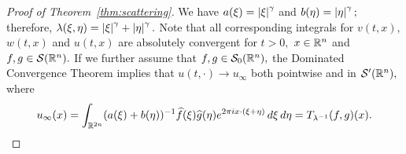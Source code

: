  
 \begin{proof}[Proof of Theorem~\ref{thm:scattering}] We have $a(\xi)=\left\vert \xi \right\vert^\gamma$ and $b(\eta)=\left\vert \eta \right\vert^\gamma;$ therefore, $\lambda(\xi,\eta)=\left\vert \xi \right\vert^\gamma+\left\vert \eta \right\vert^\gamma.$ Note that all corresponding integrals for $v(t,x),$ $w(t,x)$ and $u(t,x)$ are absolutely convergent for $t>0,$ $x\in{{\mathbb R}^n}$ and $f,g\in {\mathcal{S}}({{\mathbb R}^n}).$ If we further assume that $f,g\in {\mathcal{S}_0}({{\mathbb R}^n}),$ the Dominated Convergence Theorem implies that $u(t,\cdot)\to u_\infty$  both pointwise and in ${\mathcal{S}'}({{\mathbb R}^n}),$ where
$$
u_\infty(x)=\int_{\mathbb{R}^{2n}} (a(\xi)+b(\eta))^{-1}\widehat{f}(\xi)\widehat{g}(\eta)e^{2\pi i x \cdot (\xi + \eta)}\, d\xi\, d\eta=T_{\lambda^{-1}} (f,g)(x).
$$
%
%
%


\end{proof}
